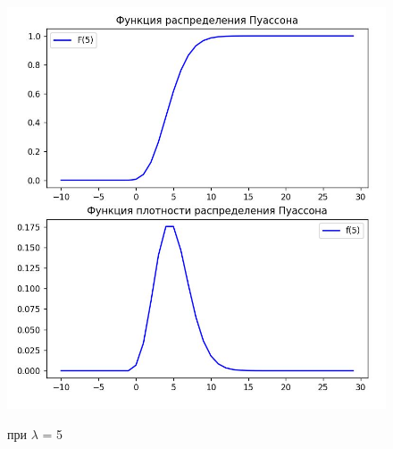 \documentclass[12pt,a4paper,oneside]{report}
\begin{document}
\begin{figure}[h]
	\centering
	\includegraphics[scale = 1]{3.jpg}
	\label{fig:screenshot003}
    \caption{при $\lambda$ = 5}
\end{figure}
\end{document}
